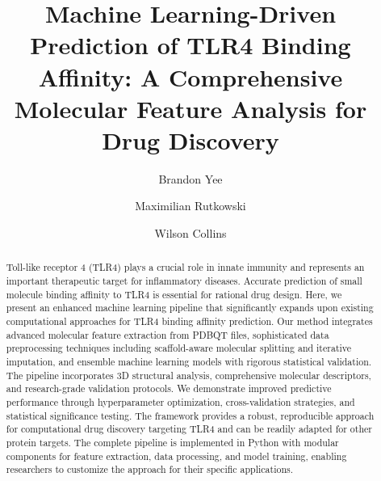 \documentclass[preprint, 10pt]{elsarticle}
\begin{document}
\begin{frontmatter}



\title{Machine Learning-Driven Prediction of TLR4 Binding Affinity: A Comprehensive Molecular Feature Analysis for Drug Discovery}


\author[inst1]{Brandon Yee}

\author[inst1]{Maximilian Rutkowski}

\author[inst1]{Wilson Collins}

\address[inst1]{Independents}

\begin{abstract}
Toll-like receptor 4 (TLR4) plays a crucial role in innate immunity and represents an important therapeutic target for inflammatory diseases. Accurate prediction of small molecule binding affinity to TLR4 is essential for rational drug design. Here, we present an enhanced machine learning pipeline that significantly expands upon existing computational approaches for TLR4 binding affinity prediction. Our method integrates advanced molecular feature extraction from PDBQT files, sophisticated data preprocessing techniques including scaffold-aware molecular splitting and iterative imputation, and ensemble machine learning models with rigorous statistical validation. The pipeline incorporates 3D structural analysis, comprehensive molecular descriptors, and research-grade validation protocols. We demonstrate improved predictive performance through hyperparameter optimization, cross-validation strategies, and statistical significance testing. The framework provides a robust, reproducible approach for computational drug discovery targeting TLR4 and can be readily adapted for other protein targets. The complete pipeline is implemented in Python with modular components for feature extraction, data processing, and model training, enabling researchers to customize the approach for their specific applications.
\end{abstract}


\end{frontmatter}
\end{document}
